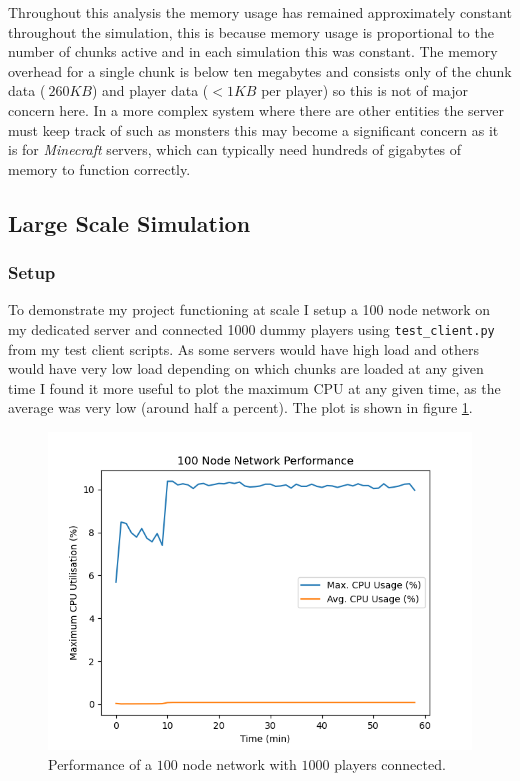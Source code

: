 \documentclass[10pt,twoside,notitlepage,a4paper]{report}
\begin{document}
	Throughout this analysis the memory usage has remained approximately constant throughout the simulation, this is because memory usage is proportional to the number of chunks active and in each simulation this was constant. The memory overhead for a single chunk is below ten megabytes and consists only of the chunk data ($~260KB$) and player data ($<1KB$ per player) so this is not of major concern here. In a more complex system where there are other entities the server must keep track of such as monsters this may become a significant concern as it is for \emph{Minecraft} servers, which can typically need hundreds of gigabytes of memory to function correctly.
	
	\subsection{Large Scale Simulation}
	\subsubsection{Setup}
	To demonstrate my project functioning at scale I setup a 100 node network on my dedicated server and connected 1000 dummy players using {\tt test\_client.py} from my test client scripts. As some servers would have high load and others would have very low load depending on which chunks are loaded at any given time I found it more useful to plot the maximum CPU at any given time, as the average was very low (around half a percent). The plot is shown in figure \ref{fig:big}.
	\begin{figure}
		\includegraphics[width=\textwidth]{100node.png}
		\caption{Performance of a $100$ node network with $1000$ players connected.}
		\label{fig:big}
	\end{figure}
\end{document}
